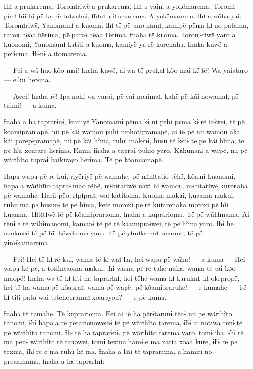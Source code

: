 Ɨhɨ a prukarema, Toromɨriwë a prukarema. Ɨhɨ a yainɨ a yokëmarema.
Toromɨ pënɨ hii hi pë ka rë taɨwehei, ɨ̃hɨnɨ a itomarema. A yokëmarema.
Ɨhɨ a wãha yai. Toromɨriwë, Yanomamɨ a kuoma. Ɨhɨ të pë uno hamɨ, kamiyë
pëma kɨ no patama, rarou hëaa hërɨma, pë paraɨ hëaa hërɨma. Ɨnaha të
kuoma. Toromɨriwë yaro a kuonomi, Yanomamɨ katiti a kuoma, kamiyë ya rë
kurenaha. Ɨnaha kuwë a përɨoma. Ɨhɨnɨ a itomarema.

--- Pei a wã huo kõo mai! Ɨnaha kuwë, ai wa të prukaɨ kõo mai kë të! Wa
yaiataro --- e ku hërɨma. 

--- Awei! Ɨnaha rë! Ipa nohi wa yaroi, pë yai nohimaɨ, kahë pë kãi
nowamaɨ, pë taimi! --- a kuma. 

Ɨnaha a ha taprarɨnɨ, kamiyë Yanomamɨ pëma kɨ ni pehi pëma kɨ rë iaɨwei,
 të pë koamipramapë, nii pë kãi wamou puhi mohotipramapë, ai të pë nii
 wamou aka kãi porepɨpramapë, nii pë kãi hĩma, ruhu makɨnɨ, husu të kɨnɨ
 të pë kãi hĩma, të pë hĩa xoarare herɨma. Kama ɨ̃naha a tapraɨ puhio
 yaro, Kukunanɨ a wapë, nii pë wãrihĩto tapraɨ haikirayo hërɨma. Të pë
 kõamiamapë. 

Hapa wapu pë rë kui, riyëriyë pë wamahe, pë mɨhɨtatio tëhë, kõami
kuonomi, hapa a wãrihĩto tapraɨ mao tëhë, mɨhɨtatiwë naxi hi wamou,
mɨhɨtatiwë kurenaha pë wamahe. Harii pëo, rɨpɨpraɨ, waɨ katitoma. Kuoma
makui, kuaama makui, ruhu ma pë husunɨ të pë hĩma, kete moroxi pë rë
kutarenaha moroxi pë hĩi kuaama. Hɨtɨtɨwë të pë kõamiprarioma. Ɨnaha a
kuprarioma. Të pë wãhɨmama. Ai tënɨ e të wãhɨmanomi, kamanɨ të pë rë
kõamipraɨwei, të pë hĩma yaro. Ɨhɨ he usukuwë të pë hĩi hëwëkema yaro.
Të pë yɨmɨkamaɨ xoaoma, të pë yɨmɨkamarema. 

--- Pei! Hei të kɨ rë kui, wama të kɨ waɨ ha, hei wapu pë wãha! --- a kuma
 --- Hei wapu kë pë, a totihitaoma makui, ɨ̃hɨ wama pë rë tahe naha, wama
 të taɨ kõo maopë! Ɨnaha wa të kɨ titi ha taprarɨnɨ, hei tëhë wama kɨ
 karukaɨ, kɨ okepropë, hei të ha wama pë kõapraɨ, wama pë wapë, pë
 kõamipraruhe! --- e kumahe --- Të kɨ titi pata wai tetehepramaɨ
 xoarayou? --- e pë kuma. 

Ɨnaha të tamahe. Të kuprarioma. Hei ai të ha përɨtarunɨ tënɨ nii pë
wãrihĩto tanomi, ɨ̃hɨ hapa a rë pëtarionoweinɨ të pë wãrihĩto tarema, ɨ̃hɨ
ai notiwa tënɨ të pë wãrihĩto tanomi. Ɨhɨ të ha taprarɨnɨ, pë wãrihĩto
tarema yaro, tomɨ iha, ɨ̃hɨ rë ma pënɨ wãrihĩto rë tanowei, tomɨ texina
hamɨ e ma xatia xoaa kure, ɨ̃hɨ rë pë texina, ɨ̃hɨ rë e ma ruhu kë ma.
Ɨnaha a kãi të taprarema, a hamiri no preaamama, ɨnaha a ha taprarɨnɨ:

